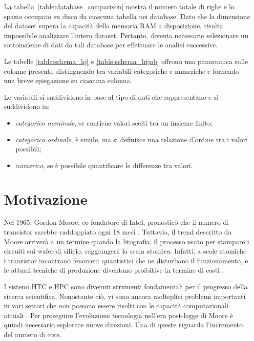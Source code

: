 La tabella~\ref{table:database_comparison} mostra il numero totale di righe e
lo spazio occupato su disco da ciascuna tabella nei database. Dato che la
dimensione del dataset supera la capacità della memoria RAM a disposizione,
risulta impossibile analizzare l'intero dataset. Pertanto, diventa necessario
selezionare un sottoinsieme di dati da tali database per effettuare le analisi
successive.

Le tabelle \ref{table:schema_hj} e \ref{table:schema_htjob} offrono una
panoramica sulle colonne presenti, distinguendo tra variabili categoriche e
numeriche e fornendo una breve spiegazione su ciascuna colonna. 

Le variabili si suddividono in base al tipo di dati che rappresentano e si
suddividono in: 

\begin{itemize}
    \item \textit{categorico nominale}, se contiene valori scelti tra un
        insieme finito;
    \item \textit{categorico ordinale}, è simile, ma si definisce una
        relazione d'ordine tra i valori possibili;
    \item \textit{numerico}, se è possibile quantificare le differenze tra valori.
\end{itemize}

\section{Motivazione}

Nel 1965, Gordon Moore, co-fondatore di Intel, pronosticò che il numero di
transistor sarebbe raddoppiato ogni 18 mesi \cite{Moore1965}. Tuttavia, il
trend descritto da Moore arriverà a un termine quando la litografia, il
processo usato per stampare i circuiti sui wafer di silicio, raggiungerà la
scala atomica. Infatti, a scale atomiche i transistor incontrano fenomeni
quantistici che ne disturbano il funzionamento, e le attuali tecniche di
produzione diventano proibitive in termine di costi \cite{Shalf2015,
Theis2017}.

I sistemi HTC e HPC sono divenuti strumenti fondamentali per il progresso
della ricerca scientifica. Nonostante ciò, vi sono ancora molteplici problemi
importanti in vari settori che non possono essere risolti con le capacità
computazionali attuali \cite{Villa2014}. Per proseguire l'evoluzione
tecnologia nell'era post-legge di Moore è quindi necessario esplorare nuove
direzioni. Una di queste riguarda l'incremento del numero di core.

